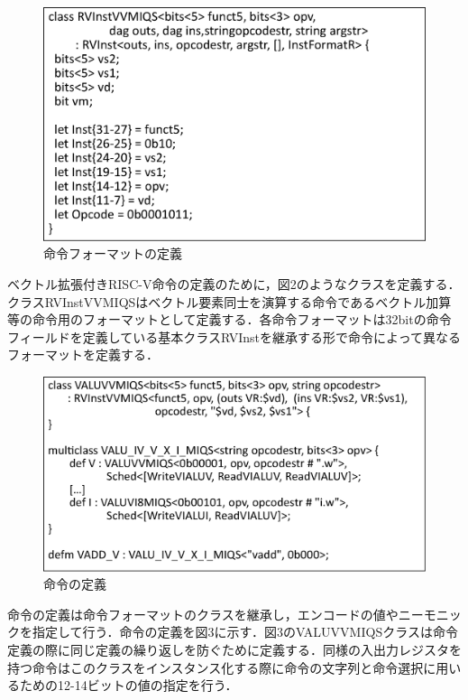 ﻿\documentclass[a4j]{jarticle}
\begin{document}
\begin{figure}[t]
    \centering
    \includegraphics[scale=0.35]{RVInstVVMIQS.eps}
    \vspace{-1truemm}
    \caption{命令フォーマットの定義}
    \vspace{-2truemm}
    \label{fig:Instruciton_format}
\end{figure}

ベクトル拡張付きRISC-V命令の定義のために，図2のようなクラスを定義する．クラスRVInstVVMIQSはベクトル要素同士を演算する命令であるベクトル加算等の命令用のフォーマットとして定義する．各命令フォーマットは32bitの命令フィールドを定義している基本クラスRVInstを継承する形で命令によって異なるフォーマットを定義する．

\begin{figure}[t]
    \centering
    \includegraphics[scale=0.35]{Instruction.eps}
    \vspace{-7truemm}
    \caption{命令の定義}
    \vspace{-4truemm}
    \label{fig:Instruciton}
\end{figure}

命令の定義は命令フォーマットのクラスを継承し，エンコードの値やニーモニックを指定して行う．命令の定義を図3に示す．図3のVALUVVMIQSクラスは命令定義の際に同じ定義の繰り返しを防ぐために定義する．同様の入出力レジスタを持つ命令はこのクラスをインスタンス化する際に命令の文字列と命令選択に用いるための12-14ビットの値の指定を行う．
\end{document}
